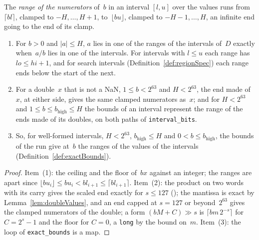 \begin{lemma}\label{lem:numeratorRanges}
  \leanok
  The \emph{range of the numerators} of~$b$ in an interval $[l, u]$ over the values runs
  from~$\lceil b l \rceil$, clamped to $-H, \dots, H + 1$, to~$\lfloor b u \rfloor$, clamped to
  $-H - 1, \dots, H$, an infinite end going to the end of its clamp.
  \begin{enumerate}
    \item For $b > 0$ and $|a| \le H$, $a$ lies in one of the ranges of the intervals of~$D$
      exactly when~$a/b$ lies in one of the intervals. For intervals with $l \le u$ each range has
      $\mathit{lo} \le \mathit{hi} + 1$, and for search intervals (Definition~\ref{def:regionSpec})
      each range ends below the start of the next.
    \item For a double~$x$ that is not a NaN, $1 \le b < 2^{63}$ and $H < 2^{63}$, the end made
      of~$x$, at either side, gives the same clamped numerators as~$x$; and for $H < 2^{63}$ and
      $1 \le b \le b_{\mathrm{high}} \le H$ the bounds of an interval represent the range of the
      ends made of its doubles, on both paths of \verb|interval_bits|.
    \item So, for well-formed intervals, $H < 2^{63}$, $b_{\mathrm{high}} \le H$ and
      $0 < b \le b_{\mathrm{high}}$, the bounds of the run give at~$b$ the ranges of the values of
      the intervals (Definition~\ref{def:exactBounds}).
  \end{enumerate}
\end{lemma}

\begin{proof}
  \leanok
  Item~(1): the ceiling and the floor of~$b x$ against an integer; the ranges are apart since
  $\lfloor b u_i \rfloor \le b u_i < b l_{i+1} \le \lceil b l_{i+1} \rceil$. Item~(2): the product
  on two words with its carry gives the scaled end exactly for $s \le 127$
  (); the mantissa is exact by
  Lemma~\ref{lem:doubleValues}, and an end capped at $s = 127$ or beyond~$2^{63}$ gives the clamped
  numerators of the double; a form $(b M + C) \gg s$ is $\lceil b m\,2^{-s} \rceil$ for
  $C = 2^s - 1$ and the floor for $C = 0$, a \verb|long| by the bound on~$m$. Item~(3): the loop of
  \verb|exact_bounds| is a map.
\end{proof}

